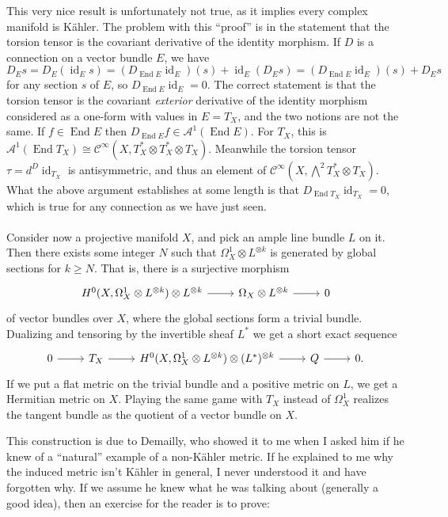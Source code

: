 \documentclass[10pt,a4paper]{article}
\newcommand{\cc}[1]{\mathcal{#1}}
\DeclareMathOperator{\End}{End}
\DeclareMathOperator{\id}{id}
\begin{document}
This very nice result is unfortunately not true, as it implies every complex manifold is K\"ahler. The problem with this ``proof'' is in the statement that the torsion tensor is the covariant derivative of the identity morphism. If $D$ is a connection on a vector bundle $E$, we have
\[
D_E s
= D_E(\id_{E} s)
= (D_{\End E}\id_E)(s) + \id_E(D_Es)
= (D_{\End E}\id_E)(s) + D_Es
\]
for any section $s$ of $E$, so $D_{\End E}\id_E = 0$. The correct statement is that the torsion tensor is the covariant \emph{exterior} derivative of the identity morphism considered as a one-form with values in $E = T_X$, and the two notions are not the same. If $f \in \End E$ then $D_{\End E}f \in \cc A^1(\End E)$. For $T_X$, this is $\cc A^1(\End T_X) \cong \cc C^\infty(X,T_X^* \otimes T_X^* \otimes T_X)$. Meanwhile the torsion tensor $\tau = d^D \id_{T_X}$ is antisymmetric, and thus an element of $\cc C^\infty(X,\bigwedge^2 T_X^* \otimes T_X)$. What the above argument establishes at some length is that $D_{\End T_X} \id_{T_X} = 0$, which is true for any connection as we have just seen.


\paragraph{}

Consider now a projective manifold $X$, and pick an ample line bundle $L$ on it. Then there exists some integer $N$ such that $\Omega_X^1 \otimes L^{\otimes k}$ is generated by global sections for $k \geq N$. That is, there is a surjective morphism
\[
\begin{tikzcd}
H^0(X, \Omega_X^1 \otimes L^{\otimes k}) \otimes L^{\otimes k} \arrow[r] & \Omega_X \otimes L^{\otimes k} \arrow[r] & 0
\end{tikzcd}
\]
of vector bundles over $X$, where the global sections form a trivial bundle. Dualizing and tensoring by the invertible sheaf $L^*$ we get a short exact sequence
\[
\begin{tikzcd}
0 \arrow[r] & T_X \arrow[r] & H^0(X, \Omega_X^1 \otimes L^{\otimes k}) \otimes (L^*)^{\otimes k} \arrow[r] & Q \arrow[r] & 0.
\end{tikzcd}
\]
If we put a flat metric on the trivial bundle and a positive metric on $L$, we get a Hermitian metric on $X$. Playing the same game with $T_X$ instead of $\Omega_X^1$ realizes the tangent bundle as the quotient of a vector bundle on $X$.

This construction is due to Demailly, who showed it to me when I asked him if he knew of a ``natural'' example of a non-K\"ahler metric. If he explained to me why the induced metric isn't K\"ahler in general, I never understood it and have forgotten why. If we assume he knew what he was talking about (generally a good idea), then an exercise for the reader is to prove:
\end{document}
